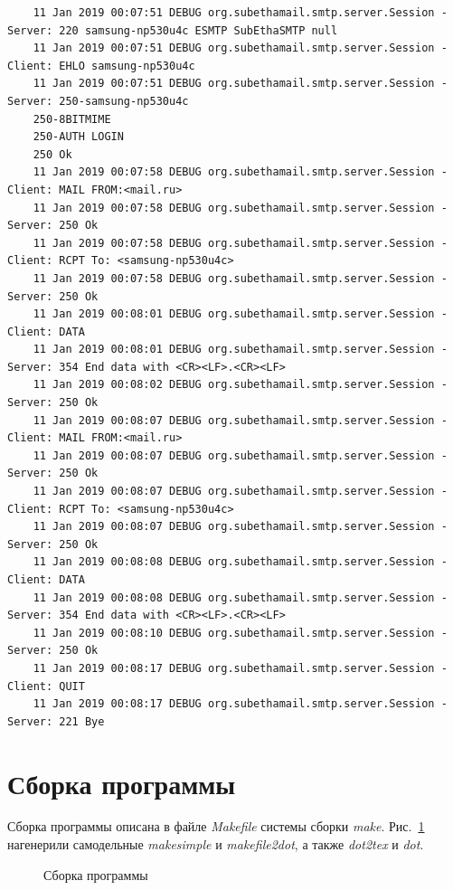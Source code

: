 \documentclass[a4paper,12pt]{report}
\begin{document}
\begin{verbatim}
    11 Jan 2019 00:07:51 DEBUG org.subethamail.smtp.server.Session - Server: 220 samsung-np530u4c ESMTP SubEthaSMTP null
    11 Jan 2019 00:07:51 DEBUG org.subethamail.smtp.server.Session - Client: EHLO samsung-np530u4c
    11 Jan 2019 00:07:51 DEBUG org.subethamail.smtp.server.Session - Server: 250-samsung-np530u4c
    250-8BITMIME
    250-AUTH LOGIN
    250 Ok
    11 Jan 2019 00:07:58 DEBUG org.subethamail.smtp.server.Session - Client: MAIL FROM:<mail.ru>
    11 Jan 2019 00:07:58 DEBUG org.subethamail.smtp.server.Session - Server: 250 Ok
    11 Jan 2019 00:07:58 DEBUG org.subethamail.smtp.server.Session - Client: RCPT To: <samsung-np530u4c>
    11 Jan 2019 00:07:58 DEBUG org.subethamail.smtp.server.Session - Server: 250 Ok
    11 Jan 2019 00:08:01 DEBUG org.subethamail.smtp.server.Session - Client: DATA
    11 Jan 2019 00:08:01 DEBUG org.subethamail.smtp.server.Session - Server: 354 End data with <CR><LF>.<CR><LF>
    11 Jan 2019 00:08:02 DEBUG org.subethamail.smtp.server.Session - Server: 250 Ok
    11 Jan 2019 00:08:07 DEBUG org.subethamail.smtp.server.Session - Client: MAIL FROM:<mail.ru>
    11 Jan 2019 00:08:07 DEBUG org.subethamail.smtp.server.Session - Server: 250 Ok
    11 Jan 2019 00:08:07 DEBUG org.subethamail.smtp.server.Session - Client: RCPT To: <samsung-np530u4c>
    11 Jan 2019 00:08:07 DEBUG org.subethamail.smtp.server.Session - Server: 250 Ok
    11 Jan 2019 00:08:08 DEBUG org.subethamail.smtp.server.Session - Client: DATA
    11 Jan 2019 00:08:08 DEBUG org.subethamail.smtp.server.Session - Server: 354 End data with <CR><LF>.<CR><LF>
    11 Jan 2019 00:08:10 DEBUG org.subethamail.smtp.server.Session - Server: 250 Ok
    11 Jan 2019 00:08:17 DEBUG org.subethamail.smtp.server.Session - Client: QUIT
    11 Jan 2019 00:08:17 DEBUG org.subethamail.smtp.server.Session - Server: 221 Bye
\end{verbatim}


\section{Сборка программы}

Сборка программы описана в файле \textit{Makefile} системы сборки \textit{make}. Рис.~\ref{fig:make} нагенерили самодельные \textit{makesimple} и \textit{makefile2dot}, а также \textit{dot2tex} и \textit{dot}.

\begin{figure}
\centering
\caption{Сборка программы}
\label{fig:make}
\end{figure}
\end{document}
